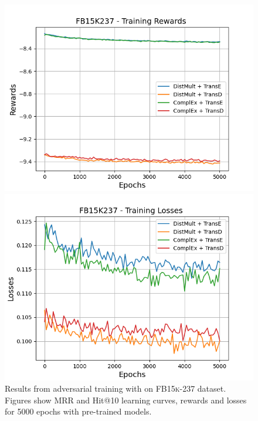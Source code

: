 \begin{figure}
    \begin{minipage}{.5\textwidth}
      \centering
      \includegraphics[width=\linewidth]{figures/results/gan_train/pretrained/uncertainty/max_distribution/entropy/fb15k237/5k_epochs/uncertainty_fb15k237_rew.png}
    \end{minipage}%
     \begin{minipage}{.5\textwidth}
      \centering
      \includegraphics[width=\linewidth]{figures/results/gan_train/pretrained/uncertainty/max_distribution/entropy/fb15k237/5k_epochs/uncertainty_fb15k237_losses.png}
    \end{minipage}%
    \caption{Results from adversarial training with \ussoftmax on \textsc{FB15k-237} dataset.
    Figures show MRR and Hit@10 learning curves, rewards and losses for 5000 epochs with pre-trained models.}
    \label{fig:gan_train_pretrained_ussoftmax_fb15k237}
\end{figure}
